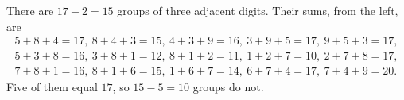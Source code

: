 There are $17-2=15$ groups of three adjacent digits. Their sums, from the left, are
\[
\begin{array}{l}
5+8+4=17,\ 8+4+3=15,\ 4+3+9=16,\ 3+9+5=17,\ 9+5+3=17,\\
5+3+8=16,\ 3+8+1=12,\ 8+1+2=11,\ 1+2+7=10,\ 2+7+8=17,\\
7+8+1=16,\ 8+1+6=15,\ 1+6+7=14,\ 6+7+4=17,\ 7+4+9=20.
\end{array}
\]
Five of them equal $17$, so $15-5=\boxed{10}$ groups do not.
